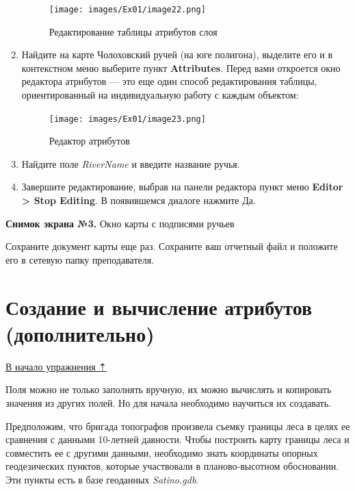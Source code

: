 \documentclass[12pt,]{book}
\begin{document}
\begin{enumerate}
  \begin{figure}
  \centering
  \texttt{[image: images/Ex01/image22.png]}
  \caption{Редактирование таблицы атрибутов слоя}
  \end{figure}
\item
  Найдите на карте Чолоховский ручей (на юге полигона), выделите его и в контекстном меню выберите пункт \textbf{Attributes}. Перед вами откроется окно редактора атрибутов --- это еще один способ редактирования таблицы, ориентированный на индивидуальную работу с каждым объектом:

  \begin{figure}
  \centering
  \texttt{[image: images/Ex01/image23.png]}
  \caption{Редактор атрибутов}
  \end{figure}
\item
  Найдите поле \emph{RiverName} и введите название ручья.
\item
  Завершите редактирование, выбрав на панели редактора пункт меню \textbf{Editor \textgreater{} Stop Editing}. В появившемся диалоге нажмите Да.
\end{enumerate}

\textbf{Снимок экрана №3.} Окно карты с подписями ручьев

Сохраните документ карты еще раз. Сохраните ваш отчетный файл и положите его в сетевую папку преподавателя.

\hypertarget{map-design-quaternary-calculation}{%
\section{Создание и вычисление атрибутов (дополнительно)}\label{map-design-quaternary-calculation}}

\protect\hyperlink{map-design-quaternary}{В начало упражнения ⇡}

Поля можно не только заполнять вручную, их можно вычислять и копировать значения из других полей. Но для начала необходимо научиться их создавать.

Предположим, что бригада топографов произвела съемку границы леса в целях ее сравнения с данными 10-летней давности. Чтобы построить карту границы леса и совместить ее с другими данными, необходимо знать координаты опорных геодезических пунктов, которые участвовали в планово-высотном обосновании. Эти пункты есть в базе геоданных \emph{Satino.gdb}.
\end{document}
